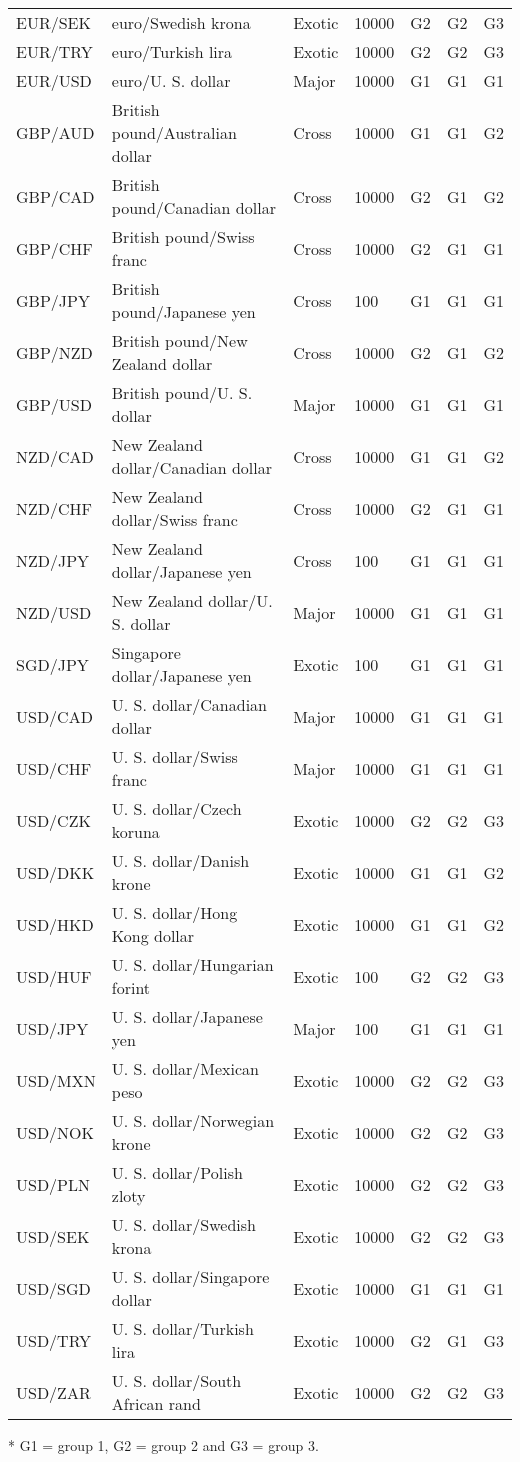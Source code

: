 \begin{table*}
\begin{center}
\begin{centering}
\begin{threeparttable}
\begin{tabular}{lllllll}
    EUR/SEK & euro/Swedish krona & Exotic & 10000 & G2 & G2 & G3\tabularnewline
    EUR/TRY & euro/Turkish lira & Exotic & 10000 & G2 & G2 & G3\tabularnewline
    EUR/USD & euro/U. S. dollar & Major & 10000 & G1 & G1 & G1\tabularnewline
    GBP/AUD & British pound/Australian dollar & Cross & 10000 & G1 & G1 & G2\tabularnewline
    GBP/CAD & British pound/Canadian dollar & Cross & 10000 & G2 & G1 & G2\tabularnewline
    GBP/CHF & British pound/Swiss franc & Cross & 10000 & G2 & G1 & G1\tabularnewline
    GBP/JPY & British pound/Japanese yen & Cross & 100 & G1 & G1 & G1\tabularnewline
    GBP/NZD & British pound/New Zealand dollar & Cross & 10000 & G2 & G1 & G2\tabularnewline
    GBP/USD & British pound/U. S. dollar & Major & 10000 & G1 & G1 & G1\tabularnewline
    NZD/CAD & New Zealand dollar/Canadian dollar & Cross & 10000 & G1 & G1 & G2\tabularnewline
    NZD/CHF & New Zealand dollar/Swiss franc & Cross & 10000 & G2 & G1 & G1\tabularnewline
    NZD/JPY & New Zealand dollar/Japanese yen & Cross & 100 & G1 & G1 & G1\tabularnewline
    NZD/USD & New Zealand dollar/U. S. dollar & Major & 10000 & G1 & G1 & G1\tabularnewline
    SGD/JPY & Singapore dollar/Japanese yen & Exotic & 100 & G1 & G1 & G1\tabularnewline
    USD/CAD & U. S. dollar/Canadian dollar & Major & 10000 & G1 & G1 & G1\tabularnewline
    USD/CHF & U. S. dollar/Swiss franc & Major & 10000 & G1 & G1 & G1\tabularnewline
    USD/CZK & U. S. dollar/Czech koruna & Exotic & 10000 & G2 & G2 & G3\tabularnewline
    USD/DKK & U. S. dollar/Danish krone & Exotic & 10000 & G1 & G1 & G2\tabularnewline
    USD/HKD & U. S. dollar/Hong Kong dollar & Exotic & 10000 & G1 & G1 & G2\tabularnewline
    USD/HUF & U. S. dollar/Hungarian forint & Exotic & 100 & G2 & G2 & G3\tabularnewline
    USD/JPY & U. S. dollar/Japanese yen & Major & 100 & G1 & G1 & G1\tabularnewline
    USD/MXN & U. S. dollar/Mexican peso & Exotic & 10000 & G2 & G2 & G3\tabularnewline
    USD/NOK & U. S. dollar/Norwegian krone & Exotic & 10000 & G2 & G2 & G3\tabularnewline
    USD/PLN & U. S. dollar/Polish zloty & Exotic & 10000 & G2 & G2 & G3\tabularnewline
    USD/SEK & U. S. dollar/Swedish krona & Exotic & 10000 & G2 & G2 & G3\tabularnewline
    USD/SGD & U. S. dollar/Singapore dollar & Exotic & 10000 & G1 & G1 & G1\tabularnewline
    USD/TRY & U. S. dollar/Turkish lira & Exotic & 10000 & G2 & G1 & G3\tabularnewline
    USD/ZAR & U. S. dollar/South African rand & Exotic & 10000 & G2 & G2 & G3\tabularnewline
    \end{tabular}

    \begin{tablenotes}
    \item[*] G1 = group 1, G2 = group 2 and G3 = group 3.
    \end{tablenotes}
    \end{threeparttable}
\end{centering}
\end{center}
\end{table*}

